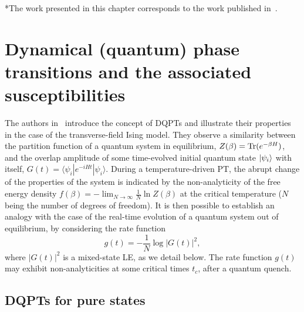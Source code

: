 \begin{center}
 *The work presented in this chapter corresponds to the work published in~\cite{mer:vla:pau:vie:viy:18}.
\end{center}

\newpage


\section{Dynamical (quantum) phase transitions and the associated susceptibilities}
\label{Sec: DQPTs and Susceptibilities}
The authors in~\cite{hey:pol:keh:13} introduce the concept of DQPTs and illustrate their properties in the case of the transverse-field Ising model. They observe a similarity between the partition function of a quantum system in equilibrium, $Z(\beta)=\text{Tr}(e^{-\beta H})$, and the overlap amplitude of some time-evolved initial quantum state $| \psi_i \rangle$ with itself, $G(t)=\langle\psi_i|e^{-iHt}|\psi_i\rangle$. During a temperature-driven PT, the abrupt change of the properties of the system is indicated by the non-analyticity of the free energy density $f(\beta)=-\lim_{N\to\infty}\frac{1}{N}\ln Z(\beta)$ at the critical temperature ($N$ being the number of degrees of freedom). It is then possible to establish an analogy with the case of the real-time evolution of a quantum system out of equilibrium, by considering the rate function 
\begin{equation}
\label{eq:rate}
g(t)=-\frac{1}{N}\log |G(t)|^2,
\end{equation} 
where $|G(t)|^2$ is a mixed-state LE, as we detail below. The rate function $g(t)$ may exhibit non-analyticities at some critical times $t_c$, after a quantum quench. 


\subsection{DQPTs for pure states}
\label{Subsec: DQPT for pure states}

